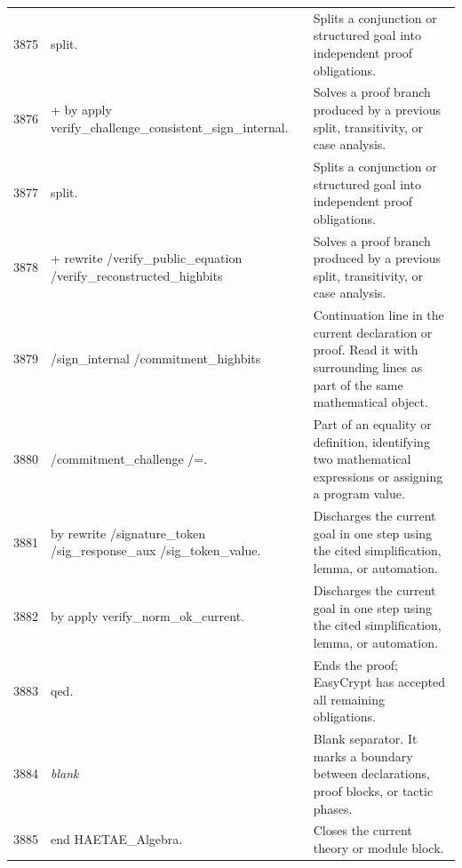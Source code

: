 \documentclass[10pt]{article}
\begin{document}
\begin{longtable}{r L{0.53\textwidth} L{0.37\textwidth}}
3875 & {\ttfamily\scriptsize split.} & Splits a conjunction or structured goal into independent proof obligations. \\
3876 & {\ttfamily\scriptsize + by apply verify\_challenge\_consistent\_sign\_internal.} & Solves a proof branch produced by a previous split, transitivity, or case analysis. \\
3877 & {\ttfamily\scriptsize split.} & Splits a conjunction or structured goal into independent proof obligations. \\
3878 & {\ttfamily\scriptsize + rewrite /verify\_public\_equation /verify\_reconstructed\_highbits} & Solves a proof branch produced by a previous split, transitivity, or case analysis. \\
3879 & {\ttfamily\scriptsize            /sign\_internal /commitment\_highbits} & Continuation line in the current declaration or proof.  Read it with surrounding lines as part of the same mathematical object. \\
3880 & {\ttfamily\scriptsize            /commitment\_challenge /=.} & Part of an equality or definition, identifying two mathematical expressions or assigning a program value. \\
3881 & {\ttfamily\scriptsize   by rewrite /signature\_token /sig\_response\_aux /sig\_token\_value.} & Discharges the current goal in one step using the cited simplification, lemma, or automation. \\
3882 & {\ttfamily\scriptsize by apply verify\_norm\_ok\_current.} & Discharges the current goal in one step using the cited simplification, lemma, or automation. \\
3883 & {\ttfamily\scriptsize qed.} & Ends the proof; EasyCrypt has accepted all remaining obligations. \\
3884 & {\ttfamily\scriptsize \emph{blank}} & Blank separator.  It marks a boundary between declarations, proof blocks, or tactic phases. \\
3885 & {\ttfamily\scriptsize end HAETAE\_Algebra.} & Closes the current theory or module block. \\
\bottomrule
\end{longtable}
\end{document}
